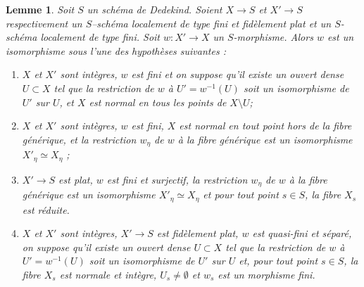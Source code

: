 \documentclass[11pt]{amsart}
\numberwithin{equation}{section}
\newtheorem{lem}[thm]{Lemme}
\theoremstyle{definition}
\theoremstyle{remark}
\begin{document}
\begin{lem}\label{technique} Soit $S$ un sch\'ema de Dedekind. Soient $X\to S$ et $X'\to S$ respectivement un $S$--sch\'ema localement de type fini et fid\`element plat  et un $S$-sch\'ema localement de type fini. Soit $w:X' \to X$ un $S$-morphisme. Alors $w$ est un isomorphisme sous l'une des hypoth\`eses suivantes :
\begin{enumerate}
\item $X$ et $X'$ sont int\`egres,  $w$ est fini et on suppose qu'il existe un ouvert dense $U \subset X$ tel que la restriction de $w$ \`a $U'=w^{-1} (U)$ soit un isomorphisme de $U'$ sur $U$, et $X$ est normal en tous les points de $X\setminus U$;
\item $X$ et $X'$ sont int\`egres, $w$ est fini, $X$ est normal en tout point hors de la fibre g\'en\'erique, et la restriction $w_\eta $ de $w$ \`a la fibre g\'en\'erique est un isomorphisme $X'_\eta \simeq X_\eta$ ;
\item $X'\to S$ est plat, $w$ est fini et surjectif, la restriction $w_\eta $ de $w$ \`a la fibre g\'en\'erique est un isomorphisme $X'_\eta \simeq X_\eta$ et pour tout point $s\in S$, la fibre $X_s$ est r\'eduite.
\item $X$ et $X'$ sont int\`egres, $X'\to S$ est fid\`element plat, $w$ est quasi-fini et s\'epar\'e, on suppose qu'il existe un ouvert dense $U \subset X$ tel que la restriction de $w$ \`a $U'=w^{-1} (U)$ soit un isomorphisme de $U'$ sur $U$ et, pour tout point $s \in S$, la fibre $X_s$ est normale et int\`egre, $U_s \not=\emptyset$ et $w_s$ est un morphisme fini.
\end{enumerate}
\end{lem}
\end{document}
